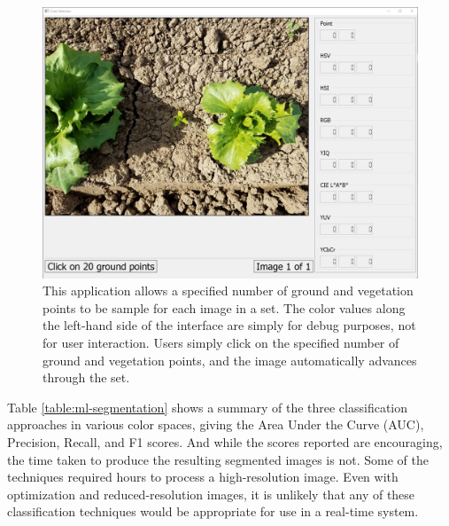 \documentclass[letterpaper]{report}
\begin{document}
{\begin{figure}[H]
	\centering
	\includegraphics[scale=0.30]{./figures/color-screenshot.png}
	\caption[Color sampling UI]{This application allows a specified number of ground and vegetation points to be sample for each image in a set. The color values along the left-hand side of the interface are simply for debug purposes, not for user interaction. Users simply click on the specified number of ground and vegetation points, and the image automatically advances through the set.}
	\label{fig:color-application}
\end{figure}

%

Table \ref{table:ml-segmentation} shows a summary of the three classification approaches in various color spaces, giving the Area Under the Curve (AUC), Precision, Recall, and F1 scores. And while the  scores reported are encouraging, the time taken to produce the resulting segmented images is not. Some of the techniques required hours to process a high-resolution image. Even with optimization and reduced-resolution images, it is unlikely that any of these classification techniques would be appropriate for use in a real-time system.

{
\renewcommand*{\arraystretch}{0.89}

%


}}
\end{document}
